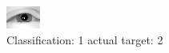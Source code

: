 \begin{figure}[h!]
\begin{center}
\includegraphics[width=0.60\columnwidth]{figures/ID2273_class_1_target_2.png}
\end{center}
\caption{ Classification: 1 actual target: 2}
\label{fig:ID2273_class_1_target_2}
\end{figure}
